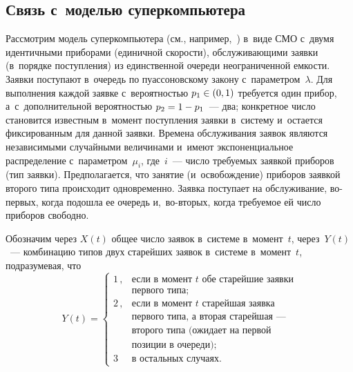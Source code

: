 \begin{multicols}{2}
\section{Связь с~моделью суперкомпьютера}

Рассмотрим модель суперкомпьютера (см., например,~\cite{tlm,ee1}) в~виде СМО 
с~двумя идентичными приборами (единичной скорости),
обслуживающими заявки (в~порядке поступления) из \mbox{единственной} очереди 
неограниченной емкости. Заявки поступают в~очередь по пуассоновскому закону с~параметром~$\lambda$.
Для выполнения каждой заявке с~ве\-ро\-ят\-ностью ${p_1\hm\in (0,1)}$ требуется один 
прибор, а~с~дополнительной ве\-ро\-ят\-ностью $p_2\hm= 1-p_1$~--- два; конкретное число становится 
известным в~момент поступления заявки в~сис\-те\-му и~остается фиксированным для данной заявки.
Времена обслуживания заявок являются независимыми случайными величинами и~имеют экспоненциальное распределение
с~параметром~$\mu_i$, где~$i$~--- число тре\-бу\-емых заявкой приборов (тип заявки).
Предполагается, что занятие (и~освобождение) приборов заявкой второго типа
происходит одновременно. Заявка поступает на обслуживание, во-пер\-вых, когда
подошла ее очередь и,~во-вто\-рых, когда требуемое ей число приборов свободно.


Обозначим через ${X}(t)$ общее число заявок в~сис\-те\-ме в~момент~$t$,
через~${Y}(t)$~--- комбинацию типов двух старейших заявок в~сис\-те\-ме 
в~момент~$t$,
под\-разу\-ме\-вая, что 
$$
Y(t)=\begin{cases}
1\,, &\!\! \mbox{если\ в~момент~$t$\ обе\ старейшие\ заявки}\\
&\!\!\mbox{первого\ типа};\\
2\,, &\!\! \mbox{если\ в~момент~$t$\ старейшая\ заявка}\\
&\!\!\mbox{первого\ типа,\ а~вторая\ 
старейшая~---}\\
&\!\!\mbox{второго\ типа\ (ожидает\ на\ первой}\\ 
&\!\!\mbox{позиции\ в~очереди)};\\
3 &\!\! \mbox{в~остальных\ случаях}.
\end{cases}
$$


\end{multicols}
